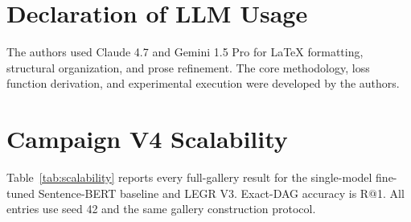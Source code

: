 \documentclass{article}
\begin{document}
\section*{Declaration of LLM Usage}
The authors used Claude 4.7 and Gemini 1.5 Pro for LaTeX formatting, structural organization, and prose refinement. The core methodology, loss function derivation, and experimental execution were developed by the authors.


\nocite{*}

\medskip
\small




\clearpage
\appendix

\section{Campaign V4 Scalability}

Table~\ref{tab:scalability} reports every full-gallery result for the single-model fine-tuned Sentence-BERT baseline and LEGR V3. Exact-DAG accuracy is R@1. All entries use seed 42 and the same gallery construction protocol.

\begin{table}[h]
\caption{Retrieval on Campaign V4 topology-held-out splits. $\dagger$ Mean GED was not recorded in the stored V3 no-GED summaries at 30/45 tools.}
\label{tab:scalability}
\centering
\scriptsize
{}
\end{table}
\end{document}
